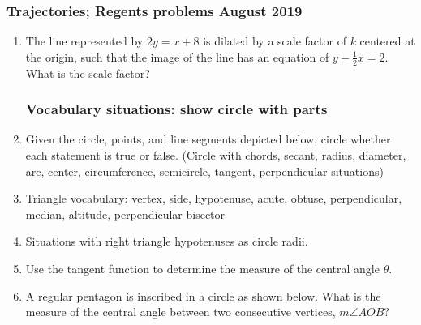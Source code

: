 \documentclass[12pt, twoside]{article}
\begin{document}
\subsubsection*{Trajectories; Regents problems August 2019}
  \begin{enumerate}

\subsubsection*{Sketch the situation on the axes. Mark important values. Do NOT solve!}
 
  \item The line represented by $2y=x+8$ is dilated by a scale factor of $k$ centered at the origin, such that the image of the line has an equation of $\displaystyle y-\frac{1}{2}x=2$. What is the scale factor?
  \begin{center}
  \end{center}

\newpage
\subsubsection*{Vocabulary situations: show circle with parts}
    
  \item Given the circle, points, and line segments depicted below, circle whether each statement is true or false.
  (Circle with chords, secant, radius, diameter, arc, center, circumference, semicircle, tangent, perpendicular situations)
  
  \item Triangle vocabulary: vertex, side, hypotenuse, acute, obtuse, perpendicular, median, altitude, perpendicular bisector
  
  \item Situations with right triangle hypotenuses as circle radii.

  \item Use the tangent function to determine the measure of the central angle $\theta$.
  
  \item A regular pentagon is inscribed in a circle as shown below. What is the measure of the central angle between two consecutive vertices, $m\angle AOB$?
  

\end{enumerate}
\end{document}
